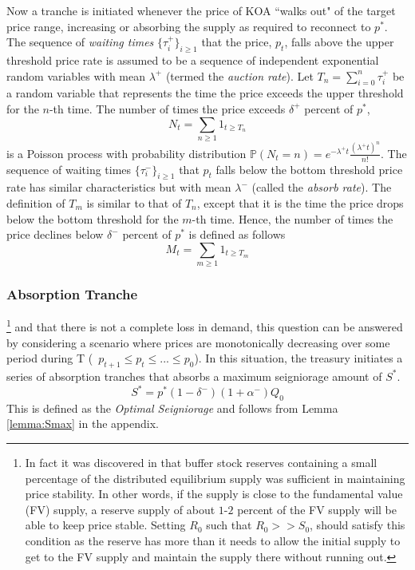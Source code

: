 Now a tranche is initiated whenever the price of KOA ``walks out" of the target price range, increasing or absorbing the supply as required to reconnect to $p^*$. The sequence of \textit{waiting times} $\{ \tau^+_i \}_{i \geq 1}$ that the price, $p_t$, falls above the upper threshold price rate is assumed to be a sequence of independent exponential random variables with mean $\lambda^+$ (termed the \textit{auction rate}). Let $T_n = \sum_{i=0}^n \tau_i^+$  be a random variable that represents the time the price exceeds the upper threshold for the $n$-th time. The number of times the price exceeds $\delta^+$ percent of $p^*$,
%
\begin{equation} \label{eq:bullcount}
N_t = \sum_{n \geq 1} 1_{t \geq T_n} 
\end{equation}
%
is a Poisson process with probability distribution $\mathbb{P}(N_t = n) = e^{-\lambda^+ t} \frac{(\lambda^+ t)^n}{n!}$. The sequence of waiting times $\{ \tau^-_i \}_{i \geq 1}$ that $p_t$ falls below the bottom threshold price rate has similar characteristics but with mean $\lambda^-$ (called the \textit{absorb rate}). The definition of $T_m$ is similar to that of $T_n$, except that it is the time the price drops below the bottom threshold for the $m$-th time. Hence, the number of times the price declines below $\delta^-$ percent of $p^*$ is defined as follows
%
\begin{equation} \label{eq:bearcount}
M_t = \sum_{m \geq 1} 1_{t \geq T_m} 
\end{equation}

\subsubsection{Absorption Tranche}
%
%
\footnote{In fact it was discovered in \cite{Ath08} that buffer stock reserves containing a small percentage of the distributed equilibrium supply was sufficient in maintaining price stability. In other words, if the supply is close to the fundamental value (FV) supply, a reserve supply of about $1$-$2$ percent of the FV supply will be able to keep price stable. Setting $R_0$ such that $R_0 >> S_0$, should satisfy this condition as the reserve has more than it needs to allow the initial supply to get to the FV supply and maintain the supply there without running out.} 
%
and that there is not a complete loss in demand, this question can be answered by considering a scenario where prices are monotonically decreasing over some period during T (\ie\ $p_{t+1} \leq p_t \leq ... \leq p_0$). In this situation, the treasury initiates a series of absorption tranches that absorbs a maximum seigniorage amount of $S^*$. 
%
\begin{equation} \label{eq:Smax}
S^* = p^*(1-\delta^-)(1+\alpha^-)Q_0
\end{equation}
%
This is defined as the \textit{Optimal Seigniorage} and follows from Lemma \ref{lemma:Smax} in the appendix.

